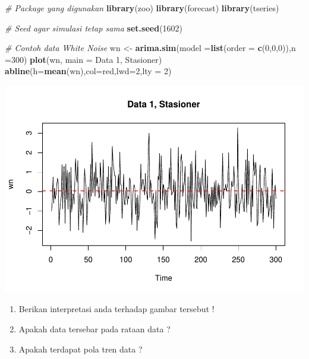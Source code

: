 \documentclass[
]{book}
\newenvironment{Shaded}{\begin{snugshade}}{\end{snugshade}}
\newcommand{\AttributeTok}[1]{\textcolor[rgb]{0.13,0.29,0.53}{#1}}
\newcommand{\CommentTok}[1]{\textcolor[rgb]{0.56,0.35,0.01}{\textit{#1}}}
\newcommand{\DecValTok}[1]{\textcolor[rgb]{0.00,0.00,0.81}{#1}}
\newcommand{\FunctionTok}[1]{\textcolor[rgb]{0.13,0.29,0.53}{\textbf{#1}}}
\newcommand{\NormalTok}[1]{#1}
\newcommand{\OtherTok}[1]{\textcolor[rgb]{0.56,0.35,0.01}{#1}}
\newcommand{\StringTok}[1]{\textcolor[rgb]{0.31,0.60,0.02}{#1}}
\begin{document}
\begin{Shaded}
\begin{Highlighting}[]
\CommentTok{\# Package yang digunakan }
\FunctionTok{library}\NormalTok{(zoo)}
\FunctionTok{library}\NormalTok{(forecast)}
\FunctionTok{library}\NormalTok{(tseries)}

\CommentTok{\# Seed agar simulasi tetap sama}
\FunctionTok{set.seed}\NormalTok{(}\DecValTok{1602}\NormalTok{)}

\CommentTok{\# Contoh data White Noise}
\NormalTok{wn }\OtherTok{\textless{}{-}} \FunctionTok{arima.sim}\NormalTok{(}\AttributeTok{model =}\FunctionTok{list}\NormalTok{(}\AttributeTok{order =} \FunctionTok{c}\NormalTok{(}\DecValTok{0}\NormalTok{,}\DecValTok{0}\NormalTok{,}\DecValTok{0}\NormalTok{)),}\AttributeTok{n =}\DecValTok{300}\NormalTok{)}
\FunctionTok{plot}\NormalTok{(wn, }\AttributeTok{main =} \StringTok{\textquotesingle{}Data 1, Stasioner\textquotesingle{}}\NormalTok{)}
\FunctionTok{abline}\NormalTok{(}\AttributeTok{h=}\FunctionTok{mean}\NormalTok{(wn),}\AttributeTok{col=}\StringTok{\textquotesingle{}red\textquotesingle{}}\NormalTok{,}\AttributeTok{lwd=}\DecValTok{2}\NormalTok{,}\AttributeTok{lty =} \DecValTok{2}\NormalTok{)}
\end{Highlighting}
\end{Shaded}

\begin{center}\includegraphics{_main_files/figure-latex/Contoh Plot yang Stasioner dan Tidak Stasioner-1} \end{center}
\begin{jp}{}{}
\begin{enumerate}
\item Berikan interpretasi anda terhadap gambar tersebut !  
\item Apakah data tersebar pada rataan data ?  
\item Apakah terdapat pola tren data ?
\end{enumerate}
\end{jp}
\end{document}
